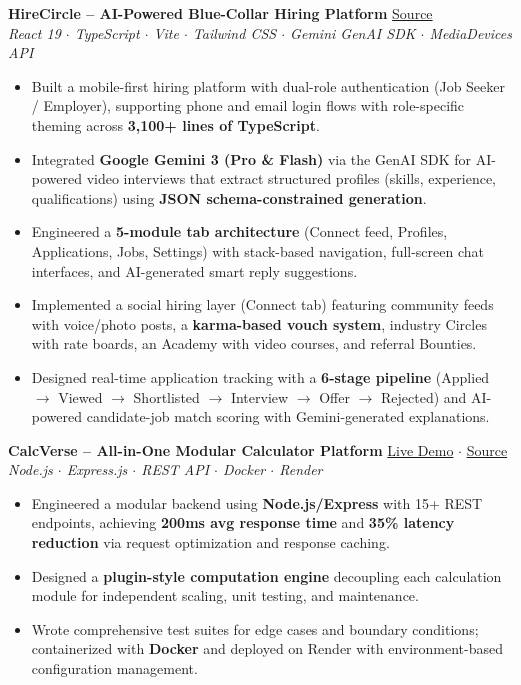 \documentclass[a4paper,9.5pt]{article}
\begin{document}
\textbf{HireCircle -- AI-Powered Blue-Collar Hiring Platform} \hfill
\href{https://github.com/Lokeshgandreddy81/HireCircle}{Source}\\
\textit{React 19 $\cdot$ TypeScript $\cdot$ Vite $\cdot$ Tailwind CSS $\cdot$ Gemini GenAI SDK $\cdot$ MediaDevices API}
\begin{itemize}
    \item Built a mobile-first hiring platform with dual-role authentication (Job Seeker / Employer), supporting phone and email login flows with role-specific theming across \textbf{3,100+ lines of TypeScript}.
    \item Integrated \textbf{Google Gemini 3 (Pro \& Flash)} via the GenAI SDK for AI-powered video interviews that extract structured profiles (skills, experience, qualifications) using \textbf{JSON schema-constrained generation}.
    \item Engineered a \textbf{5-module tab architecture} (Connect feed, Profiles, Applications, Jobs, Settings) with stack-based navigation, full-screen chat interfaces, and AI-generated smart reply suggestions.
    \item Implemented a social hiring layer (Connect tab) featuring community feeds with voice/photo posts, a \textbf{karma-based vouch system}, industry Circles with rate boards, an Academy with video courses, and referral Bounties.
    \item Designed real-time application tracking with a \textbf{6-stage pipeline} (Applied $\rightarrow$ Viewed $\rightarrow$ Shortlisted $\rightarrow$ Interview $\rightarrow$ Offer $\rightarrow$ Rejected) and AI-powered candidate-job match scoring with Gemini-generated explanations.
\end{itemize}

\textbf{CalcVerse -- All-in-One Modular Calculator Platform} \hfill
\href{https://calcverse.onrender.com}{Live Demo} $\cdot$
\href{https://github.com/Lokeshgandreddy81/Vidhyalaya}{Source}\\
\textit{Node.js $\cdot$ Express.js $\cdot$ REST API $\cdot$ Docker $\cdot$ Render}
\begin{itemize}
    \item Engineered a modular backend using \textbf{Node.js/Express} with 15+ REST endpoints, achieving \textbf{200ms avg response time} and \textbf{35\% latency reduction} via request optimization and response caching.
    \item Designed a \textbf{plugin-style computation engine} decoupling each calculation module for independent scaling, unit testing, and maintenance.
    \item Wrote comprehensive test suites for edge cases and boundary conditions; containerized with \textbf{Docker} and deployed on Render with environment-based configuration management.
\end{itemize}
\end{document}
